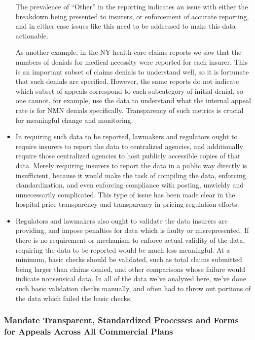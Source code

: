 \documentclass[12pt, a4paper,twoside,parskip=full]{report}
\theoremstyle{plain} %
\theoremstyle{definition} %
\theoremstyle{remark} %
\numberwithin{equation}{chapter}
\begin{document}
\begin{itemize}
			The prevalence of ``Other'' in the reporting indicates an issue with either the breakdown being
			presented to insurers, or enforcement of accurate reporting, and in either case issues like this need to be addressed to make
			this data actionable.
			
			As another example, in the NY health care claims reports we saw that the numbers of denials
			for medical necessity were reported for each insurer. This is an important subset of claims denials to understand
			well, so it is fortunate that such denials are specified. However, the same reports do not indicate which subset of
			appeals correspond to each subcategory of initial denial, so one cannot, for example, use the data to understand
			what the internal appeal rate is for NMN denials specifically. Transparency of such metrics is crucial for meaningful
			change and monitoring.
			
			\item In requiring such data to be reported, lawmakers and regulators ought to require insurers to report the data to centralized 
			agencies, and additionally require those centralized agencies to host publicly accessible copies of that data. Merely requiring 
			insurers to report the data in a public way directly is insufficient, because it would make the task of compiling the data, enforcing 
			standardization, and even enforcing compliance with posting, unwieldy and unnecessarily complicated. This type of issue has been made clear in the hospital 
			price transparency and transparency in pricing regulation efforts.
			
			\item Regulators and lawmakers also ought to validate the data insurers are providing, and impose penalties for data
			which is faulty or misrepresented. If there is no requirement or mechanism to enforce actual validity of the data,
			requiring the data to be reported would be much less meaningful. At a minimum, basic checks should be validated, such as
			total claims submitted being larger than claims denied, and other comparisons whose failure would indicate nonsensical data. In all
			of the data we've analyzed here, we've done such basic validation checks manually, and often had to throw out portions of the
			data which failed the basic checks.
		
			
		\end{itemize}
		
		\subsubsection{Mandate Transparent, Standardized Processes and Forms for Appeals Across All Commercial Plans}
		
\end{document}
